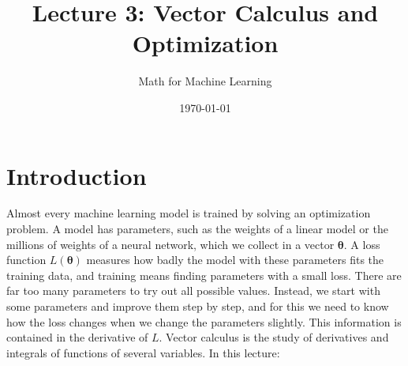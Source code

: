 \documentclass[11pt]{article}
\title{Lecture 3: Vector Calculus and Optimization}
\author{Math for Machine Learning}
\date{\today}
\theoremstyle{definition}
\theoremstyle{plain}
\theoremstyle{remark}
\begin{document}
\maketitle
\tableofcontents

\section*{Introduction}

Almost every machine learning model is trained by solving an optimization problem. A model has parameters, such as the weights of a linear model or the millions of weights of a neural network, which we collect in a vector $\boldsymbol{\theta}$. A loss function $L(\boldsymbol{\theta})$ measures how badly the model with these parameters fits the training data, and training means finding parameters with a small loss. There are far too many parameters to try out all possible values. Instead, we start with some parameters and improve them step by step, and for this we need to know how the loss changes when we change the parameters slightly. This information is contained in the derivative of $L$. Vector calculus is the study of derivatives and integrals of functions of several variables. In this lecture:
\end{document}
